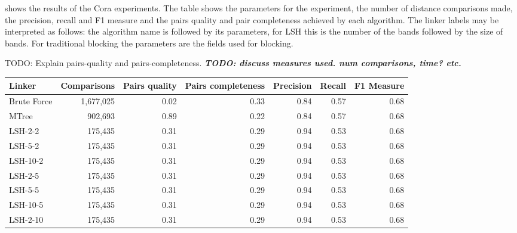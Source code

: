 \documentclass{llncs}
\begin{document}
 shows the results of the Cora experiments. The table shows the parameters for the experiment, the number of distance comparisons made, the precision, recall and F1 measure and the pairs quality and pair completeness achieved by each algorithm.  The linker labels may be interpreted as follows: the algorithm name is followed by its parameters, for LSH this is the number of the bands followed by the size of bands. For traditional blocking the parameters are the fields used for blocking.


TODO: Explain pairs-quality and pairs-completeness.
\emph{\textbf{TODO: discuss measures used. num comparisons, time? etc.}}


\begin{table}[ht]
\centering
\begin{tabular}{l|r|r|r|r|r|r}
Linker & Comparisons & Pairs quality & Pairs completeness & Precision & Recall & F1 Measure \\
\hline
Brute Force        & 1,677,025                    & 0.02                  & 0.33                       & 0.84      & 0.57   & 0.68       \\ \hline
MTree              &  902,693                     & 0.89                  & 0.22                       & 0.84      & 0.57   & 0.68       \\ \hline
LSH-2-2            &  175,435                     & 0.31                  & 0.29                       & 0.94      & 0.53   & 0.68       \\
LSH-5-2            &  175,435                     & 0.31                  & 0.29                       & 0.94      & 0.53   & 0.68       \\
LSH-10-2           &  175,435                     & 0.31                  & 0.29                       & 0.94      & 0.53   & 0.68       \\
LSH-2-5            &  175,435                     & 0.31                  & 0.29                       & 0.94      & 0.53   & 0.68       \\
LSH-5-5            &  175,435                     & 0.31                  & 0.29                       & 0.94      & 0.53   & 0.68       \\
LSH-10-5           &  175,435                     & 0.31                  & 0.29                       & 0.94      & 0.53   & 0.68       \\
LSH-2-10           &  175,435                     & 0.31                  & 0.29                       & 0.94      & 0.53   & 0.68       \\

\end{tabular}
\end{table}
\end{document}
